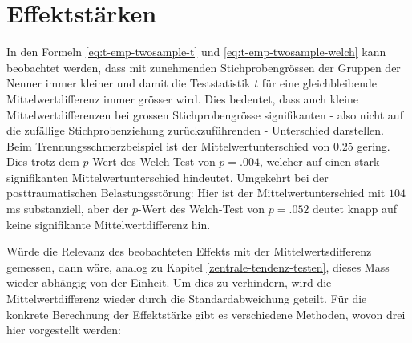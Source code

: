 \documentclass[
]{book}
\theoremstyle{definition}
\theoremstyle{definition}
\theoremstyle{definition}
\theoremstyle{definition}
\theoremstyle{remark}
\begin{document}
\section{Effektstärken}\label{effektstuxe4rken}

In den Formeln \eqref{eq:t-emp-twosample-t} und \eqref{eq:t-emp-twosample-welch} kann beobachtet werden, dass mit zunehmenden Stichprobengrössen der Gruppen der Nenner immer kleiner und damit die Teststatistik \(t\) für eine gleichbleibende Mittelwertdifferenz immer grösser wird. Dies bedeutet, dass auch kleine Mittelwertdifferenzen bei grossen Stichprobengrösse signifikanten - also nicht auf die zufällige Stichprobenziehung zurückzuführenden - Unterschied darstellen. Beim Trennungsschmerzbeispiel ist der Mittelwertunterschied von \(0.25\) gering. Dies trotz dem \(p\)-Wert des Welch-Test von \(p=.004\), welcher auf einen stark signifikanten Mittelwertunterschied hindeutet. Umgekehrt bei der posttraumatischen Belastungsstörung: Hier ist der Mittelwertunterschied mit \(104\) ms substanziell, aber der \(p\)-Wert des Welch-Test von \(p=.052\) deutet knapp auf keine signifikante Mittelwertdifferenz hin.

Würde die Relevanz des beobachteten Effekts mit der Mittelwertsdifferenz gemessen, dann wäre, analog zu Kapitel \ref{zentrale-tendenz-testen}, dieses Mass wieder abhängig von der Einheit. Um dies zu verhindern, wird die Mittelwertdifferenz wieder durch die Standardabweichung geteilt. Für die konkrete Berechnung der Effektstärke gibt es verschiedene Methoden, wovon drei hier vorgestellt werden:
\end{document}
